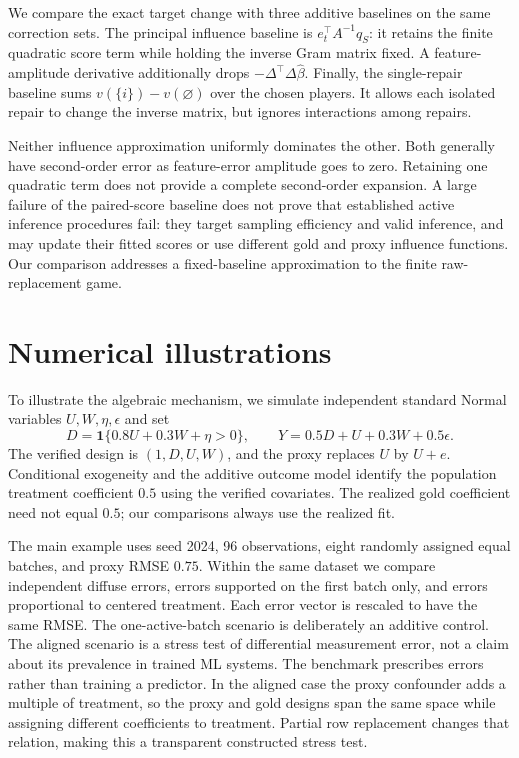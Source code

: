 \documentclass[11pt]{article}
\begin{document}
We compare the exact target change with three additive baselines on the same
correction sets. The principal influence baseline is $e_t^\top A^{-1}q_S$: it
retains the finite quadratic score term while holding the inverse Gram matrix
fixed. A feature-amplitude derivative additionally drops
$-\Delta^\top\Delta\widehat\beta$. Finally, the single-repair baseline sums
$v(\{i\})-v(\varnothing)$ over the chosen players. It allows each isolated repair
to change the inverse matrix, but ignores interactions among repairs.

Neither influence approximation uniformly dominates the other. Both generally
have second-order error as feature-error amplitude goes to zero. Retaining one
quadratic term does not provide a complete second-order expansion. A large
failure of the paired-score baseline does not prove that established active
inference procedures fail: they target sampling efficiency and valid inference,
and may update their fitted scores or use different gold and proxy influence
functions. Our comparison addresses a fixed-baseline approximation to the finite
raw-replacement game.

\section{Numerical illustrations}

To illustrate the algebraic mechanism, we simulate independent standard Normal variables $U,W,\eta,\epsilon$ and set
\begin{equation}
 D=\mathbf 1\{0.8U+0.3W+\eta>0\},\qquad
 Y=0.5D+U+0.3W+0.5\epsilon.
\end{equation}
The verified design is $(1,D,U,W)$, and the proxy replaces $U$ by $U+e$.
Conditional exogeneity and the additive outcome model identify the population
treatment coefficient $0.5$ using the verified covariates. The realized gold
coefficient need not equal $0.5$; our comparisons always use the realized fit.

The main example uses seed 2024, 96 observations, eight randomly assigned equal
batches, and proxy RMSE $0.75$. Within the same dataset we compare independent
diffuse errors, errors supported on the first batch only, and errors proportional
to centered treatment. Each error vector is rescaled to have the same RMSE.
The one-active-batch scenario is deliberately an additive control. The aligned
scenario is a stress test of differential measurement error, not a claim about
its prevalence in trained ML systems. The benchmark prescribes errors rather
than training a predictor. In the aligned case the proxy confounder adds a
multiple of treatment, so the proxy and gold designs span the same space while
assigning different coefficients to treatment. Partial row replacement changes
that relation, making this a transparent constructed stress test.
\end{document}
